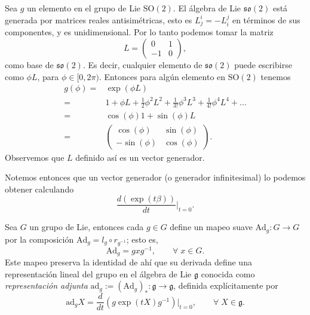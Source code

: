 \begin{ex}
Sea $g$ un elemento en el grupo de Lie $\mathrm{SO}(2)$. El \'{a}lgebra de Lie $\mathfrak{so}(2)$ est\'{a} generada por matrices reales antisim\'{e}tricas, esto es $L^{i}_{j} = -L^{j}_{i}$ en t\'{e}rminos de sus componentes, y es unidimensional. Por lo tanto podemos tomar la matriz
%
\[L = 
 \begin{pmatrix}
  0 & 1 \\
  -1 & 0
 \end{pmatrix},
\]
%
como base de $\mathfrak{so}(2)$. Es decir, cualquier elemento de $\mathfrak{so}(2)$ puede escribirse como $\phi L$, para $\phi \in [0, 2 \pi)$. Entonces para alg\'{u}n elemento en $\mathrm{SO}(2)$  tenemos
%
\begin{align*}
g (\phi) = & \exp (\phi L) \\
= & 1 + \phi L + \frac{1}{2} \phi^{2} L^{2} + \frac{1}{3 !} \phi^{3} L^{3} + \frac{1}{4 !} \phi^{4} L^{4} + ... \\
= & \cos (\phi) 1 + \sin (\phi) L \\
= & \begin{pmatrix} \cos (\phi) & \sin (\phi) \\ -\sin (\phi) & \cos (\phi) \end{pmatrix}.
\end{align*}
%
Observemos que $L$ definido as\'{i} es un vector generador.
\end{ex}

\begin{obs}
Notemos entonces que un vector generador (o generador infinitesimal) lo podemos obtener calculando $$\frac{d (\exp (t \beta))}{dt} \bigg\vert_{t=0}.$$
\end{obs}

\begin{mydef}
Sea $G$ un grupo de Lie, entonces cada $g \in G$ define un mapeo suave $\mathrm{Ad}_{g}: G \rightarrow G$ por la composici\'{o}n $\mathrm{Ad}_{g} = l_{g} \circ r_{g^{-1}}$; esto es,
%
\begin{equation}
\mathrm{Ad}_{g} = g x g^{-1}, \qquad \forall \; x \in G.
\end{equation}
%
Este mapeo preserva la identidad de ah\'{i} que su derivada define una representaci\'{o}n lineal del grupo en el \'{a}lgebra de Lie $\mathfrak{g}$ conocida como \emph{representaci\'{o}n adjunta} $\mathrm{ad}_{g} := (\mathrm{Ad}_{g})_{*} : \mathfrak{g} \rightarrow \mathfrak{g}$, definida expl\'{i}citamente por
%
\begin{equation}
\mathrm{ad}_{g} X = \frac{d}{dt} \left(g \exp (t X) g^{-1} \right) \bigg\vert_{t=0}, \qquad \forall \; X \in \mathfrak{g}.
\end{equation}
%
\end{mydef}

